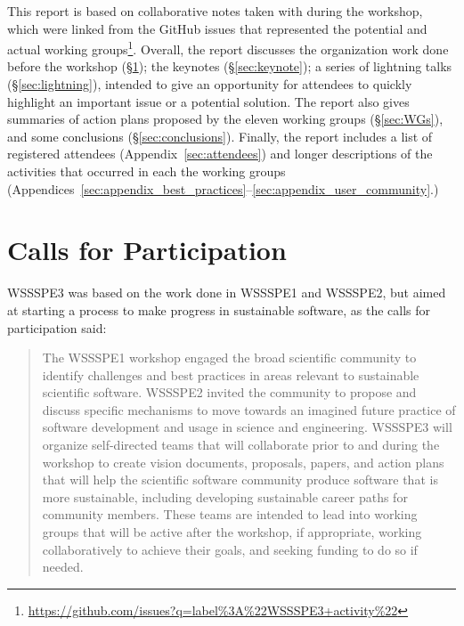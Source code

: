 \documentclass[11pt, oneside]{amsart}
\begin{document}
This report is based on collaborative notes taken with during the workshop,
which were linked from the GitHub issues that represented the potential and
actual working
groups\footnote{\url{https://github.com/issues?q=label\%3A\%22WSSSPE3+activity\%22}}.
Overall, the report discusses the organization work done before the workshop
(\S\ref{sec:preworkshop}); the keynotes (\S\ref{sec:keynote}); a series of
lightning talks (\S\ref{sec:lightning}), intended to give an opportunity for
attendees to quickly highlight an important issue or a potential solution. The
report also gives summaries of action plans proposed by the eleven working
groups (\S\ref{sec:WGs}), and some conclusions (\S\ref{sec:conclusions}).
Finally, the report includes a list of registered attendees
(Appendix~\ref{sec:attendees}) and longer descriptions of the activities that
occurred in each the working groups
(Appendices~\ref{sec:appendix_best_practices}--\ref{sec:appendix_user_community}.)



\section{Calls for Participation} \label{sec:preworkshop}

WSSSPE3 was based on the work done in WSSSPE1 and WSSSPE2, but aimed at starting
a process to make progress in sustainable software, as the calls for
participation said:

\begin{quote} The WSSSPE1 workshop engaged the broad scientific community to
identify challenges and best practices in areas relevant to sustainable
scientific software. WSSSPE2 invited the community to propose and discuss
specific mechanisms to move towards an imagined future practice of software
development and usage in science and engineering. WSSSPE3 will organize
self-directed teams that will collaborate prior to and during the workshop to
create vision documents, proposals, papers, and action plans that will help the
scientific software community produce software that is more sustainable,
including developing sustainable career paths for community members. These teams
are intended to lead into working groups that will be active after the workshop,
if appropriate, working collaboratively to achieve their goals, and seeking
funding to do so if needed. \end{quote}
\end{document}
